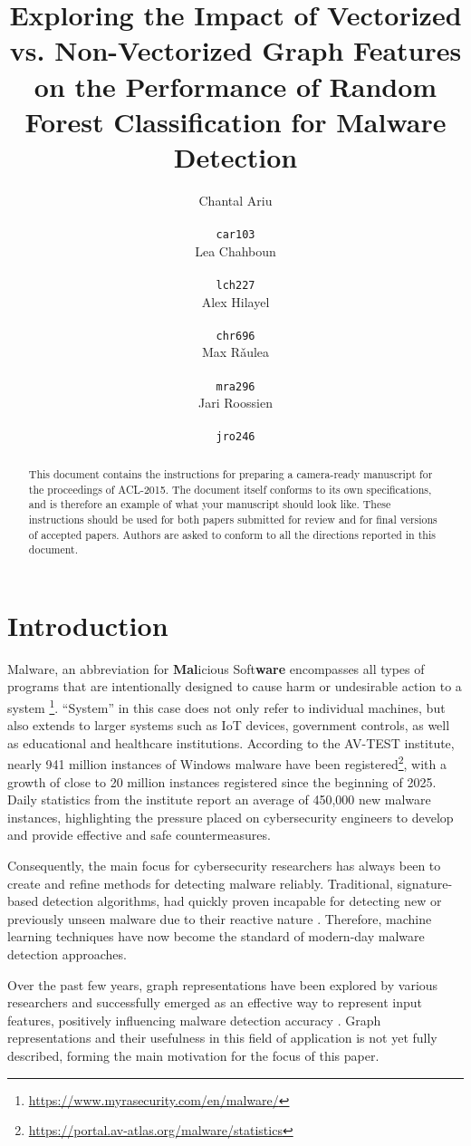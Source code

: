 \documentclass[11pt]{article}
\title{Exploring the Impact of Vectorized vs. Non-Vectorized Graph Features on the Performance of Random Forest Classification for Malware Detection
}
\author{Chantal Ariu\\ \\
  {\tt car103} \\\And
  Lea Chahboun\\ \\
  {\tt lch227} \\\And
  Alex Hilayel\\ \\
  {\tt chr696} \\\And
  Max Rǎulea\\ \\
  {\tt mra296} \\\And
  Jari Roossien\\ \\
  {\tt jro246} \\}
\date{}
\begin{document}
\maketitle
\begin{abstract}
  This document contains the instructions for preparing a camera-ready
  manuscript for the proceedings of ACL-2015. The document itself
  conforms to its own specifications, and is therefore an example of
  what your manuscript should look like. These instructions should be
  used for both papers submitted for review and for final versions of
  accepted papers.  Authors are asked to conform to all the directions
  reported in this document.
\end{abstract}

\section{Introduction}

Malware, an abbreviation for \textbf{Mal}icious Soft\textbf{ware} encompasses all types of programs that are intentionally designed to cause harm or undesirable action to a system \footnote{\href{https://www.myrasecurity.com/en/malware}{https://www.myrasecurity.com/en/malware/}}.
“System” in this case does not only refer to individual machines, but also extends to larger systems such as IoT devices, government controls, as well as educational and healthcare institutions. According to the AV-TEST institute, nearly 941 million instances of Windows malware have been registered\footnote{\label{note2} \href{https://portal.av-atlas.org/malware/statistics}{https://portal.av-atlas.org/malware/statistics}}, with a growth of close to 20 million instances registered since the beginning of 2025. Daily statistics from the institute report an average of 450,000 new malware instances, highlighting the pressure placed on cybersecurity engineers to develop and provide effective and safe countermeasures.

Consequently, the main focus for cybersecurity researchers has always been to create and refine methods for detecting malware reliably. Traditional, signature-based detection algorithms, had quickly proven incapable for detecting new or previously unseen malware due to their reactive nature \cite{inbook}. Therefore, machine learning techniques have now become the standard of modern-day malware detection approaches.

Over the past few years, graph representations have been explored by various researchers and successfully emerged as an effective way to represent input features, positively influencing malware detection accuracy \cite{9023948}. Graph representations and their usefulness in this field of application is not yet fully described, forming the main motivation for the focus of this paper.
\end{document}
